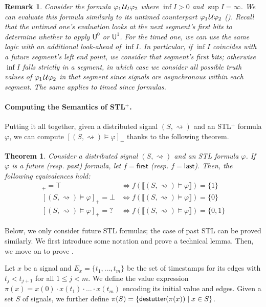 \documentclass[iicol,lineno]{sn-jnl}
\renewcommand{\cref}{\Cref}
\newcommand{\first}{\textsf{first}}
\newcommand{\last}{\textsf{last}}
\newcommand{\hb}{\rightsquigarrow}
\newcommand{\destutter}{\mathsf{destutter}}
\def\until{\kern.1em\mathcal{U}}
\newcommand{\?}{\text{?}}
\newcommand{\suchthat}{\;\ifnum\currentgrouptype=16 \middle\fi|\;}
\let\st\suchthat
\newtheorem{theorem}{Theorem}
\newtheorem{remark}{Remark}
\begin{document}
	\begin{remark}
		Consider the formula $\varphi_1 \until_I \varphi_2$ where $\inf I > 0$ and $\sup I = \infty$.
		We can evaluate this formula similarly to its untimed counterpart $\varphi_1 \until \varphi_2$ (\cref{fig:eval}).
		Recall that the untimed one's evaluation looks at the next segment's first bits to determine whether to apply $\mathsf{U}^0$ or $\mathsf{U}^1$.
		For the timed one, we can use the same logic with an additional look-ahead of $\inf I$.
		In particular, if $\inf I$ coincides with a future segment's left end point, we consider that segment's first bits; otherwise $\inf I$ falls strictly in a segment, in which case we consider all possible truth values of $\varphi_1 \until \varphi_2$ in that segment since signals are asynchronous within each segment.
		The same applies to timed since formulas.
	\end{remark}

	
	\paragraph*{Computing the Semantics of STL$^+$.}
	
	Putting it all together, given a distributed signal $(S, {\hb})$ and an STL$^+$ formula $\varphi$, we can compute $[(S,{\hb}) \models \varphi]_+$ thanks to the following theorem.
	
	\begin{theorem} \label{cl:algo}
		Consider a distributed signal $(S,{\hb})$ and an STL formula $\varphi$.
		If $\varphi$ is a future (resp. past) formula, let $f = \first$ (resp. $f = \last$).
		Then, the following equivalences hold:
		\begin{align*}
			[(S,{\hb}) \models \varphi]_+ = \top &\iff f(\llbracket (S, {\hb}) \models \varphi \rrbracket) = \{1\}\\
			[(S,{\hb}) \models \varphi]_+ = \bot &\iff f(\llbracket (S, {\hb}) \models \varphi \rrbracket) = \{0\}\\
			[(S,{\hb}) \models \varphi]_+ = {?} &\iff f(\llbracket (S, {\hb}) \models \varphi \rrbracket) = \{0,1\}
		\end{align*}
	\end{theorem}
	
	Below, we only consider future STL formulas; the case of past STL can be proved similarly.
	We first introduce some notation and prove a technical lemma.
	Then, we move on to prove \cref{cl:algo}. 
	
	Let $x$ be a signal and $E_x = \{t_1, \ldots, t_m\}$ be the set of timestamps for its edges with $t_j < t_{j+1}$ for all $1 \leq j < m$.
	We define the value expression $\pi(x) = x(0) \cdot x(t_1) \cdot \ldots \cdot x(t_m)$ encoding its initial value and edges.
	Given a set $S$ of signals, we further define $\pi(S) = \{ \destutter(\pi(x)) \st x \in S \}$.
	
\end{document}
